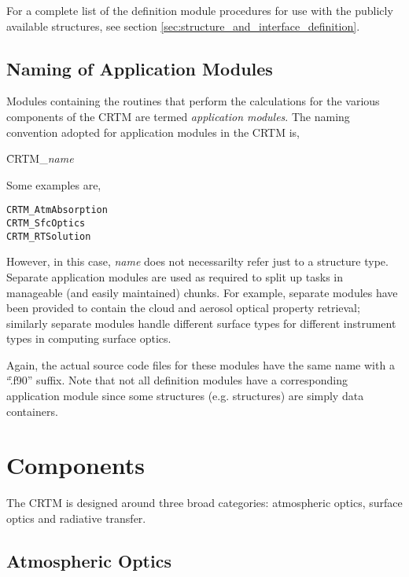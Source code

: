 For a complete list of the definition module procedures for use with the publicly available structures, see section \ref{sec:structure_and_interface_definition}.



\subsection{Naming of Application Modules}

Modules containing the routines that perform the calculations for the various components of the CRTM are termed \textit{application modules}. The naming convention adopted for application modules in the CRTM is, 

\hspace{0.5cm}\f{CRTM\_}\textit{name}

Some examples are,

\begin{alltt}
  CRTM_AtmAbsorption
  CRTM_SfcOptics
  CRTM_RTSolution\end{alltt}

However, in this case, \textit{name} does not necessarilty refer just to a structure type. Separate application modules are used as required to split up tasks in manageable (and easily maintained) chunks. For example, separate modules have been provided to contain the cloud and aerosol optical property retrieval; similarly separate modules handle different surface types for different instrument types in computing surface optics.

Again, the actual source code files for these modules have the same name with a ``\f{.f90}'' suffix. Note that not all definition modules have a corresponding application module since some structures (e.g. \SpcCoeff{} structures) are simply data containers.



\section{Components}

The CRTM is designed around three broad categories: atmospheric optics, surface optics and radiative transfer.



\subsection{Atmospheric Optics}

